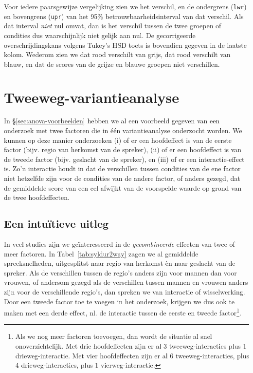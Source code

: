 \documentclass[
]{book}
\begin{document}
Voor iedere paarsgewijze vergelijking zien we het verschil, en de
ondergrens (\texttt{lwr}) en bovengrens (\texttt{upr}) van het 95\%
betrouwbaarheidsinterval van dat verschil. Als dat interval \emph{niet} nul
omvat, dan is het verschil tussen de twee groepen of condities dus
waarschijnlijk niet gelijk aan nul. De gecorrigeerde overschrijdingskans
volgens Tukey's HSD toets is bovendien gegeven in de laatste kolom.
Wederom zien we dat rood verschilt van grijs, dat rood verschilt van
blauw, en dat de scores van de grijze en blauwe groepen niet
verschillen.

\hypertarget{tweeweg-variantieanalyse}{%
\section{Tweeweg-variantieanalyse}\label{tweeweg-variantieanalyse}}

In §\ref{sec:anova-voorbeelden} hebben we al een voorbeeld gegeven
van een onderzoek met twee factoren die in één variantieanalyse
onderzocht worden. We kunnen op deze manier onderzoeken (i) of er een
hoofdeffect is van de eerste factor (bijv. regio van herkomst van de
spreker), (ii) of er een hoofdeffect is van de tweede factor (bijv.
geslacht van de spreker), en (iii) of er een interactie-effect is. Zo'n
interactie houdt in dat de verschillen tussen condities van de ene
factor niet hetzelfde zijn voor de condities van de andere factor, of
anders gezegd, dat de gemiddelde score van een cel afwijkt van de
voorspelde waarde op grond van de twee hoofdeffecten.

\hypertarget{een-intuuxeftieve-uitleg}{%
\subsection{Een intuïtieve uitleg}\label{een-intuuxeftieve-uitleg}}

In veel studies zijn we geïnteresseerd in de \emph{gecombineerde} effecten
van twee of meer factoren. In
Tabel~\ref{tab:syldur2way} zagen we al gemiddelde spreeksnelheden,
uitgesplitst naar regio van herkomst èn naar geslacht van de spreker.
Als de verschillen tussen de regio's anders zijn voor mannen dan voor
vrouwen, of andersom gezegd als de verschillen tussen mannen en vrouwen
anders zijn voor de verschillende regio's, dan spreken we van interactie
of wisselwerking. Door een tweede factor toe te voegen in het onderzoek,
krijgen we dus ook te maken met een derde effect, nl. de interactie
tussen de eerste en tweede factor\footnote{Als we nog meer factoren toevoegen, dan wordt de situatie al snel onoverzichtelijk. Met drie hoofdeffecten zijn er al 3 tweeweg-interacties plus 1 drieweg-interactie. Met vier hoofdeffecten zijn er al 6 tweeweg-interacties, plus 4 drieweg-interacties, plus 1 vierweg-interactie.}.
\end{document}
